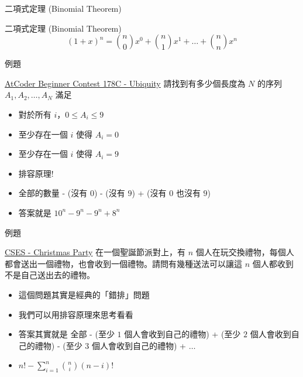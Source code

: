 \documentclass[aspectratio=169]{beamer}
\begin{document}
    \begin{frame}{二項式定理 (Binomial Theorem)}
        \begin{alertblock}{二項式定理 (Binomial Theorem)}
            $$(1+x)^n = \binom{n}{0}x^0 + \binom{n}{1}x^1+ \dots + \binom{n}{n}x^n$$
        \end{alertblock}
    \end{frame}
    
    \begin{frame}{例題}
        \begin{block}{\href{https://atcoder.jp/contests/abc178/tasks/abc178_c}{AtCoder Beginner Contest 178C - Ubiquity}}
            請找到有多少個長度為 $N$ 的序列 $A_1,A_2,\dots,A_N$ 滿足
            \begin{itemize}
                \item 對於所有 $i$，$0 \le A_i \le 9$
                \item 至少存在一個 $i$ 使得 $A_i = 0$
                \item 至少存在一個 $i$ 使得 $A_i = 9$
            \end{itemize}
        \end{block} \pause
        \begin{itemize}
            \item 排容原理!
            \item 全部的數量 - (沒有 $0$) - (沒有 $9$) + (沒有 $0$ 也沒有 $9$)
            \item 答案就是 $10^n - 9^n - 9^n + 8^n$
        \end{itemize}
    \end{frame}
    
    \begin{frame}{例題}
        \begin{block}{\href{https://cses.fi/problemset/task/1717}{CSES - Christmas Party}}
            在一個聖誕節派對上，有 $n$ 個人在玩交換禮物，每個人都會送出一個禮物，也會收到一個禮物。請問有幾種送法可以讓這 $n$ 個人都收到不是自己送出去的禮物。
        \end{block}
        \begin{itemize}
            \item<1-> 這個問題其實是經典的「錯排」問題
            \item<2-> 我們可以用排容原理來思考看看
            \item<3-> 答案其實就是 全部 - (至少 $1$ 個人會收到自己的禮物) + (至少 $2$ 個人會收到自己的禮物) - (至少 $3$ 個人會收到自己的禮物) + $\ldots$
            \item<3-> $n! - \sum_{i=1}^n \binom{n}{i} (n-i)!$
        \end{itemize}
    \end{frame}
    
\end{document}
